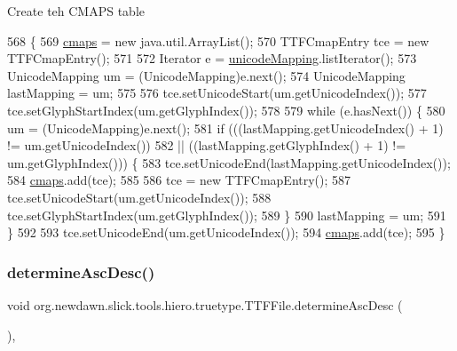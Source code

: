 Create teh C\+M\+A\+PS table 
\begin{DoxyCode}
568                                \{
569         \mbox{\hyperlink{classorg_1_1newdawn_1_1slick_1_1tools_1_1hiero_1_1truetype_1_1_t_t_f_file_a2485473f90e9a1361c892560e662d156}{cmaps}} = \textcolor{keyword}{new} java.util.ArrayList();
570         TTFCmapEntry tce = \textcolor{keyword}{new} TTFCmapEntry();
571 
572         Iterator e = \mbox{\hyperlink{classorg_1_1newdawn_1_1slick_1_1tools_1_1hiero_1_1truetype_1_1_t_t_f_file_a2c9280bb8fa734f8deb6de981a0b4fea}{unicodeMapping}}.listIterator();
573         UnicodeMapping um = (UnicodeMapping)e.next();
574         UnicodeMapping lastMapping = um;
575 
576         tce.setUnicodeStart(um.getUnicodeIndex());
577         tce.setGlyphStartIndex(um.getGlyphIndex());
578 
579         \textcolor{keywordflow}{while} (e.hasNext()) \{
580             um = (UnicodeMapping)e.next();
581             \textcolor{keywordflow}{if} (((lastMapping.getUnicodeIndex() + 1) != um.getUnicodeIndex())
582                     || ((lastMapping.getGlyphIndex() + 1) != um.getGlyphIndex())) \{
583                 tce.setUnicodeEnd(lastMapping.getUnicodeIndex());
584                 \mbox{\hyperlink{classorg_1_1newdawn_1_1slick_1_1tools_1_1hiero_1_1truetype_1_1_t_t_f_file_a2485473f90e9a1361c892560e662d156}{cmaps}}.add(tce);
585 
586                 tce = \textcolor{keyword}{new} TTFCmapEntry();
587                 tce.setUnicodeStart(um.getUnicodeIndex());
588                 tce.setGlyphStartIndex(um.getGlyphIndex());
589             \}
590             lastMapping = um;
591         \}
592 
593         tce.setUnicodeEnd(um.getUnicodeIndex());
594         \mbox{\hyperlink{classorg_1_1newdawn_1_1slick_1_1tools_1_1hiero_1_1truetype_1_1_t_t_f_file_a2485473f90e9a1361c892560e662d156}{cmaps}}.add(tce);
595     \}
\end{DoxyCode}
\mbox{\label{classorg_1_1newdawn_1_1slick_1_1tools_1_1hiero_1_1truetype_1_1_t_t_f_file_a804c8fe0fd2e1ff9402b60bed17d6b41}} 
\subsubsection{\texorpdfstring{determine\+Asc\+Desc()}{determineAscDesc()}}
{\footnotesize\ttfamily void org.\+newdawn.\+slick.\+tools.\+hiero.\+truetype.\+T\+T\+F\+File.\+determine\+Asc\+Desc (\begin{DoxyParamCaption}{ }\end{DoxyParamCaption})\hspace{0.3cm}{\ttfamily [inline]}, {\ttfamily [private]}}

